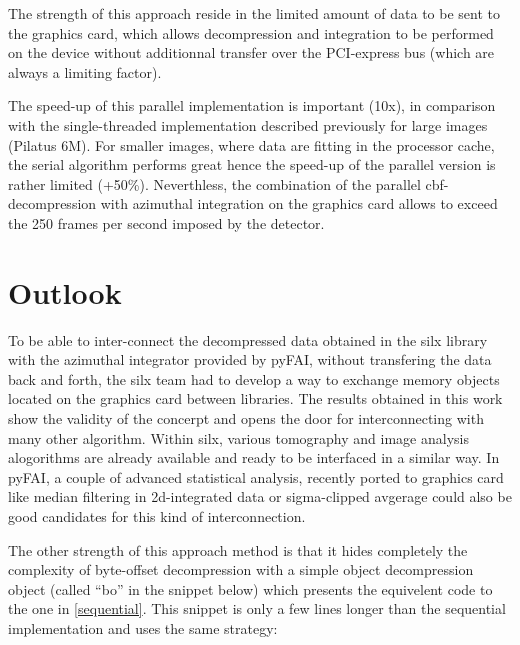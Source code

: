 \documentclass[preprint, pdf]{iucr}              %
\begin{document}
The strength of this approach reside in the limited amount of
data to be sent to the graphics card, which allows decompression and
integration to be performed on the device without additionnal
transfer over the PCI-express bus (which are always a limiting factor).

The speed-up of this parallel implementation is important (10x),
in comparison with the single-threaded implementation described previously for
large images (Pilatus 6M).
For smaller images, where data are fitting in the processor cache, the serial
algorithm performs great hence the speed-up of the parallel version is
rather limited (+50\%). 
Neverthless, the combination of the parallel cbf-decompression with azimuthal
integration on the graphics card allows to exceed the 250 frames per second
imposed by the detector. 



\section{Outlook}

To be able to inter-connect the decompressed data obtained in the silx library
with the azimuthal integrator provided by pyFAI, without transfering the data
back and forth, the silx team had to develop a way to exchange memory
objects located on the graphics card between libraries. 
The results obtained in this work show the validity of the concerpt and opens
the door for interconnecting with many other algorithm.
Within silx, various tomography and image analysis alogorithms are already
available and ready to be interfaced in a similar way. 
In pyFAI, a couple of advanced statistical analysis, recently ported to graphics
card like median filtering in 2d-integrated data or sigma-clipped avgerage could
also be good candidates for this kind of interconnection.

The other strength of this approach method is that it hides completely the
complexity of byte-offset decompression with a simple object decompression
object (called ``bo'' in the snippet below) which presents the equivelent code 
to the one in \ref{sequential}. 
This snippet is only a few lines longer than the sequential implementation and
uses the same strategy:
\end{document}
